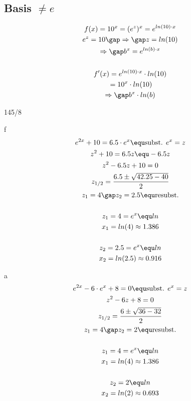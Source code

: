 \subsection{Basis $\neq e$}
\begin{gather*}
  f(x) = 10^x = (e^z)^x = e^{ln(10) \cdot x} \\
  e^z = 10 \gap\Rightarrow\gap z = ln(10) \\
  \Rightarrow\gap b^x = e^{ln(b) \cdot x} \\\\
  f'(x) = e^{ln(10) \cdot x} \cdot ln(10) \\
  \;= 10^x \cdot ln(10) \\
  \Rightarrow\gap b^x \cdot ln(b)
\end{gather*}
\begin{exercise}{145/8}
  \item [f]
  \begin{gather*}
    e^{2x} + 10 = 6.5 \cdot e^x \equ \text{subst. } e^x = z \\
    z^2 + 10 = 6.5z \equ - 6.5z \\
    z^2 - 6.5z + 10 = 0 \\
    z_{1/2} = \frac{6.5 \pm \sqrt{42.25 - 40}}{2} \\
    z_1 = 4 \gap z_2 = 2.5 \equ \text{resubst.} \\\\
    z_1 = 4 = e^x \equ ln \\
    x_1 = ln(4) \approx 1.386 \\\\
    z_2 = 2.5 = e^x \equ ln \\
    x_2 = ln(2.5) \approx 0.916
  \end{gather*}
  \item [a]
  \begin{gather*}
    e^{2x} - 6 \cdot e^x + 8 = 0 \equ \text{subst. } e^x = z \\
    z^2 - 6z + 8 = 0 \\
    z_{1/2} = \frac{6 \pm \sqrt{36 - 32}}{2} \\
    z_1 = 4 \gap z_2 = 2 \equ \text{resubst.} \\\\
    z_1 = 4 = e^x \equ ln \\
    x_1 = ln(4) \approx 1.386 \\\\
    z_2 = 2 \equ ln \\
    x_2 = ln(2) \approx 0.693
  \end{gather*}

\end{exercise}
